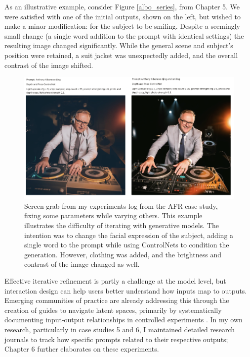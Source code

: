 As an illustrative example, consider Figure \ref{albo_series}, from Chapter 5. We were satisfied with one of the initial outputs, shown on the left, but wished to make a minor modification: for the subject to be smiling. Despite a seemingly small change (a single word addition to the prompt with identical settings) the resulting image changed significantly. While the general scene and subject's position were retained, a suit jacket was unexpectedly added, and the overall contrast of the image shifted. 

\begin{figure}[H]
    \centering
    \includegraphics[width=1\linewidth]{alboexperiments.png}
    \caption{Screen-grab from my experiments log from the AFR case study, fixing some parameters while varying others. This example illustrates the difficulty of iterating with generative models. The intention was to change the facial expression of the subject, adding a single word to the prompt while using ControlNets to condition the generation. However, clothing was added, and the brightness and contrast of the image changed as well.}
    \label{fig:albo_series}
\end{figure}


Effective iterative refinement is partly a challenge at the model level, but interaction design can help users better understand how inputs map to outputs. Emerging communities of practice are already addressing this through the creation of guides to navigate latent spaces, primarily by systematically documenting input-output relationships in controlled experiments \cite{Smith2022-dm}. In my own research, particularly in case studies 5 and 6, I maintained detailed research journals to track how specific prompts related to their respective outputs; Chapter 6 further elaborates on these experiments.

